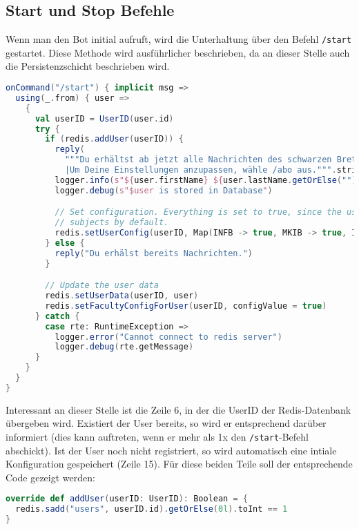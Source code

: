 \subsection{Start und Stop Befehle}\label{sec:StartStopCommands}
Wenn man den Bot initial aufruft, wird die Unterhaltung über den Befehl \texttt{/start} gestartet. Diese Methode wird ausführlicher beschrieben, da an dieser Stelle auch die Persistenzschicht beschrieben wird.

\begin{lstlisting}[language=scala, style=scala, caption=Reagieren auf Start-Befehl]
onCommand("/start") { implicit msg =>
  using(_.from) { user =>
    {
      val userID = UserID(user.id)
      try {
        if (redis.addUser(userID)) {
          reply(
            """Du erhältst ab jetzt alle Nachrichten des schwarzen Bretts und der Fakultät IWI an der HSKA.
            |Um Deine Einstellungen anzupassen, wähle /abo aus.""".stripMargin)
          logger.info(s"${user.firstName} ${user.lastName.getOrElse("")} added to subscriptions.")
          logger.debug(s"$user is stored in Database")

          // Set configuration. Everything is set to true, since the user subscribes to all
          // subjects by default.
          redis.setUserConfig(userID, Map(INFB -> true, MKIB -> true, INFM -> true))
        } else {
          reply("Du erhälst bereits Nachrichten.")
        }

        // Update the user data
        redis.setUserData(userID, user)
        redis.setFacultyConfigForUser(userID, configValue = true)
      } catch {
        case rte: RuntimeException =>
          logger.error("Cannot connect to redis server")
          logger.debug(rte.getMessage)
      }
    }
  }
}
\end{lstlisting}

Interessant an dieser Stelle ist die Zeile 6, in der die UserID der Redis-Datenbank übergeben wird. Existiert der User bereits, so wird er entsprechend darüber informiert (dies kann auftreten, wenn er mehr als 1x den \texttt{/start}-Befehl abschickt). Ist der User noch nicht registriert, so wird automatisch eine intiale Konfiguration gespeichert (Zeile 15). Für diese beiden Teile soll der entsprechende Code gezeigt werden:

\begin{lstlisting}[language=scala, style=scala, caption=Hinzufügen eines Users zur Datenbank]
override def addUser(userID: UserID): Boolean = {
  redis.sadd("users", userID.id).getOrElse(0l).toInt == 1
}
\end{lstlisting}

